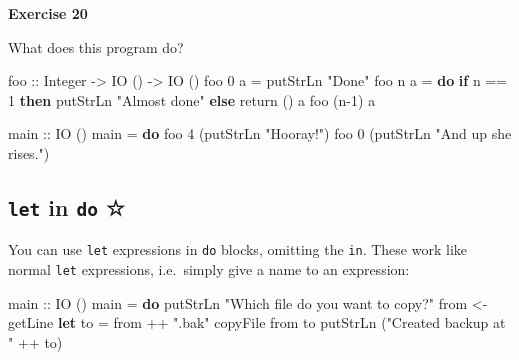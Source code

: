 \documentclass[11pt,
  american,
  DIV13]{article}
\newenvironment{Shaded}{}{}
\newcommand{\DataTypeTok}[1]{\textcolor[rgb]{0.56,0.13,0.00}{#1}}
\newcommand{\DecValTok}[1]{\textcolor[rgb]{0.25,0.63,0.44}{#1}}
\newcommand{\FunctionTok}[1]{\textcolor[rgb]{0.02,0.16,0.49}{#1}}
\newcommand{\KeywordTok}[1]{\textcolor[rgb]{0.00,0.44,0.13}{\textbf{#1}}}
\newcommand{\NormalTok}[1]{#1}
\newcommand{\OperatorTok}[1]{\textcolor[rgb]{0.40,0.40,0.40}{#1}}
\newcommand{\OtherTok}[1]{\textcolor[rgb]{0.00,0.44,0.13}{#1}}
\newcommand{\StringTok}[1]{\textcolor[rgb]{0.25,0.44,0.63}{#1}}
\begin{document}
\textbf{Exercise 20}

What does this program do?

\begin{Shaded}
\begin{Highlighting}[]
\OtherTok{foo ::} \DataTypeTok{Integer} \OtherTok{{-}\textgreater{}} \DataTypeTok{IO}\NormalTok{ () }\OtherTok{{-}\textgreater{}} \DataTypeTok{IO}\NormalTok{ ()}
\NormalTok{foo }\DecValTok{0}\NormalTok{ a }\OtherTok{=} \FunctionTok{putStrLn} \StringTok{"Done"}
\NormalTok{foo n a }\OtherTok{=} \KeywordTok{do}
   \KeywordTok{if}\NormalTok{ n }\OperatorTok{==} \DecValTok{1} \KeywordTok{then} \FunctionTok{putStrLn} \StringTok{"Almost done"}
             \KeywordTok{else} \FunctionTok{return}\NormalTok{ ()}
\NormalTok{   a}
\NormalTok{   foo (n}\OperatorTok{{-}}\DecValTok{1}\NormalTok{) a}

\OtherTok{main ::} \DataTypeTok{IO}\NormalTok{ ()}
\NormalTok{main }\OtherTok{=} \KeywordTok{do}
\NormalTok{   foo }\DecValTok{4}\NormalTok{ (}\FunctionTok{putStrLn} \StringTok{"Hooray!"}\NormalTok{)}
\NormalTok{   foo }\DecValTok{0}\NormalTok{ (}\FunctionTok{putStrLn} \StringTok{"And up she rises."}\NormalTok{)}
\end{Highlighting}
\end{Shaded}

\hypertarget{let-in-do}{%
\subsection{\texorpdfstring{\texttt{let} in \texttt{do}
☆}{let in do ☆}}\label{let-in-do}}

You can use \texttt{let} expressions in \texttt{do} blocks, omitting the
\texttt{in}. These work like normal \texttt{let} expressions,
i.e.~simply give a name to an expression:

\begin{Shaded}
\begin{Highlighting}[]
\OtherTok{main ::} \DataTypeTok{IO}\NormalTok{ ()}
\NormalTok{main }\OtherTok{=} \KeywordTok{do}
    \FunctionTok{putStrLn} \StringTok{"Which file do you want to copy?"}
\NormalTok{    from }\OtherTok{\textless{}{-}} \FunctionTok{getLine}
    \KeywordTok{let}\NormalTok{ to }\OtherTok{=}\NormalTok{ from }\OperatorTok{++} \StringTok{".bak"}
\NormalTok{    copyFile from to}
    \FunctionTok{putStrLn}\NormalTok{ (}\StringTok{"Created backup at "} \OperatorTok{++}\NormalTok{ to)}
\end{Highlighting}
\end{Shaded}
\end{document}
